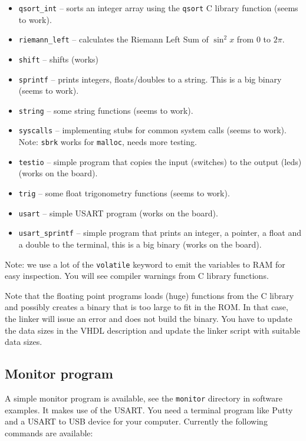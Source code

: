 \documentclass[12pt]{article}
\begin{document}
\begin{itemize}
\item \texttt{qsort\_int} -- sorts an integer array using the \texttt{qsort} C library function (seems to work).
\item \texttt{riemann\_left} -- calculates the Riemann Left Sum of $\sin^2 x$ from $0$ to $2\pi$.
\item \texttt{shift} -- shifts (works)
\item \texttt{sprintf} -- prints integers, floats/doubles to a string. This is a big binary (seems to work).
\item \texttt{string} -- some string functions (seems to work).
\item \texttt{syscalls} -- implementing stubs for common system calls (seems to work). Note: \texttt{sbrk} works for \texttt{malloc}, needs more testing.
\item \texttt{testio} -- simple program that copies the input (switches) to the output (leds) (works on the board).
\item \texttt{trig} -- some float trigonometry functions (seems to work).
\item \texttt{usart} -- simple USART program (works on the board).
\item \texttt{usart\_sprintf} -- simple program that prints an integer, a pointer, a float and a double to the terminal, this is a big binary (works on the board).
\end{itemize} 

Note: we use a lot of the \texttt{volatile} keyword to emit the variables to RAM for easy inspection. You will see compiler warnings from C library functions.

Note that the floating point programs loads (huge) functions from the C library and possibly creates a binary that is too large to fit in the ROM. In that case, the linker will issue an error and does not build the binary. You have to update the data sizes in the VHDL description and update the linker script with suitable data sizes.

\subsection{Monitor program}
A simple monitor program is available, see the \texttt{monitor} directory in software examples. It makes use of the USART. You need a terminal program like Putty and a USART to USB device for your computer. Currently the following commands are available:
\end{document}
